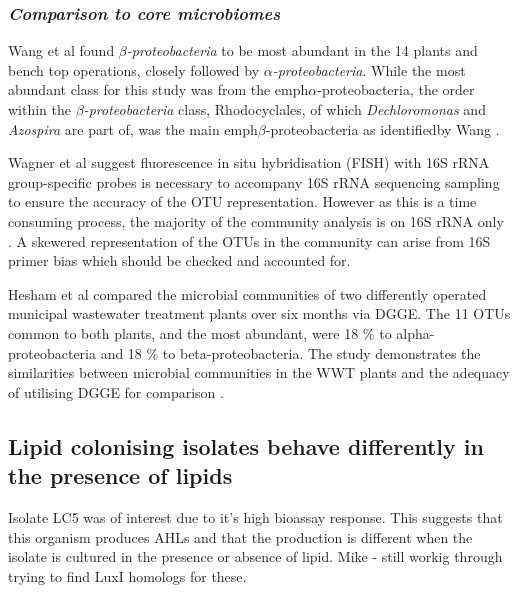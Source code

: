 \documentclass[11pt]{article}
\begin{document}
\subsubsection{\emph{Comparison to core microbiomes}}
Wang et al found \emph{$\beta$-proteobacteria} to be most abundant in the 14 plants and bench top operations, closely followed by \emph{$\alpha$-proteobacteria}. While the most abundant class for this study was from the emph{$\alpha$-proteobacteria}, the order within the \emph{$\beta$-proteobacteria} class, Rhodocyclales, of which \emph{Dechloromonas} and \emph{Azospira} are part of, was the main emph{$\beta$-proteobacteria} as identifiedby Wang \cite{wang2012pyrosequencing}.


Wagner et al suggest fluorescence in situ hybridisation (FISH) with 16S rRNA  group-specific probes is necessary to accompany 16S rRNA sequencing sampling to ensure the accuracy of the OTU representation. However as this is a time consuming process, the majority of the community analysis is on 16S rRNA only \cite{Wagner_02} . A skewered representation of the OTUs in the community can arise from 16S primer bias which should be checked and accounted for.

Hesham et al compared the microbial communities of two differently operated municipal wastewater treatment plants over six months via DGGE. The 11 OTUs common to both plants, and the most abundant, were 18 \% to alpha-proteobacteria and 18 \% to beta-proteobacteria. The study demonstrates the similarities between microbial communities in the WWT plants and the adequacy of utilising DGGE for comparison \cite{Hesham_11}.

\subsection{Lipid colonising isolates behave differently in the presence of lipids}

Isolate LC5 was of interest due to it's high bioassay response. This suggests that this organism produces AHLs and that the production is different when the isolate is cultured in the presence or absence of lipid.
Mike - still workig through trying to find LuxI homologs for these.
\end{document}
